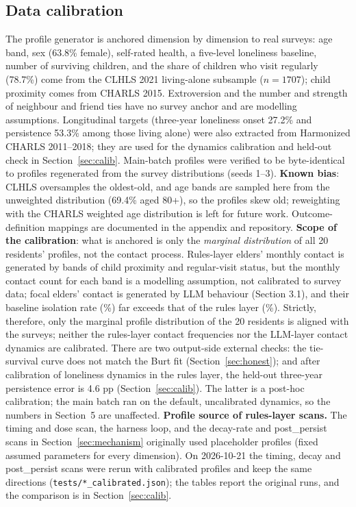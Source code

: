\documentclass[10pt,twocolumn]{article}
\begin{document}
\subsection{Data calibration}\label{sec:data}
The profile generator is anchored dimension by dimension to real surveys: age band, sex (63.8\% female), self-rated health, a five-level loneliness baseline, number of surviving children, and the share of children who visit regularly (78.7\%) come from the CLHLS 2021 living-alone subsample ($n=1707$); child proximity comes from CHARLS 2015. Extroversion and the number and strength of neighbour and friend ties have no survey anchor and are modelling assumptions. Longitudinal targets (three-year loneliness onset 27.2\% and persistence 53.3\% among those living alone) were also extracted from Harmonized CHARLS 2011--2018; they are used for the dynamics calibration and held-out check in Section~\ref{sec:calib}. Main-batch profiles were verified to be byte-identical to profiles regenerated from the survey distributions (seeds 1--3). \textbf{Known bias}: CLHLS oversamples the oldest-old, and age bands are sampled here from the unweighted distribution (69.4\% aged 80+), so the profiles skew old; reweighting with the CHARLS weighted age distribution is left for future work. Outcome-definition mappings are documented in the appendix and repository. \textbf{Scope of the calibration}: what is anchored is only the \emph{marginal distribution} of all 20 residents' profiles, not the contact process. Rules-layer elders' monthly contact is generated by bands of child proximity and regular-visit status, but the monthly contact count for each band is a modelling assumption, not calibrated to survey data; focal elders' contact is generated by LLM behaviour (Section 3.1), and their baseline isolation rate (\FocIvNone\%) far exceeds that of the rules layer (\RulIvNone\%). Strictly, therefore, only the marginal profile distribution of the 20 residents is aligned with the surveys; neither the rules-layer contact frequencies nor the LLM-layer contact dynamics are calibrated. There are two output-side external checks: the tie-survival curve does not match the Burt fit (Section~\ref{sec:honest}); and after calibration of loneliness dynamics in the rules layer, the held-out three-year persistence error is 4.6 pp (Section~\ref{sec:calib}). The latter is a post-hoc calibration; the main batch ran on the default, uncalibrated dynamics, so the numbers in Section~5 are unaffected. \textbf{Profile source of rules-layer scans.} The timing and dose scan, the harness loop, and the decay-rate and post\_persist scans in Section~\ref{sec:mechanism} originally used placeholder profiles (fixed assumed parameters for every dimension). On 2026-10-21 the timing, decay and post\_persist scans were rerun with calibrated profiles and keep the same directions (\texttt{tests/*\_calibrated.json}); the tables report the original runs, and the comparison is in Section~\ref{sec:calib}.
\end{document}
